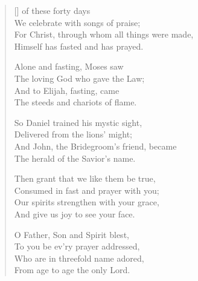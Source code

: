 \newHymn
{}

\begin{verse}[\versewidth]
 of these forty days\\
We celebrate with songs of praise;\\
For Christ, through whom all things were made,\\
Himself has fasted and has prayed.

Alone and fasting, Moses saw\\
The loving God who gave the Law;\\
And to Elijah, fasting, came\\
The steeds and chariots of flame.

So Daniel trained his mystic sight,\\
Delivered from the lions' might;\\
And John, the Bridegroom’s friend, became\\
The herald of the Savior’s name.

Then grant that we like them be true,\\
Consumed in fast and prayer with you;\\
Our spirits strengthen with your grace,\\
And give us joy to see your face.

O Father, Son and Spirit blest,\\
To you be ev'ry prayer addressed,\\
Who are in threefold name adored,\\
From age to age the only Lord.

\end{verse}



